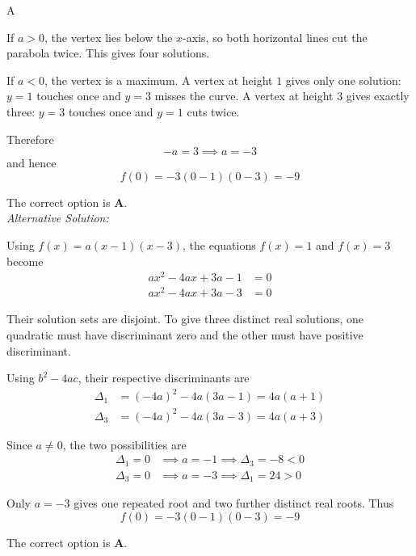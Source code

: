 \documentclass[11pt,a4paper]{article}
\begin{document}
\begin{enumerate}[label=\textbf{\arabic*.},leftmargin=*,itemsep=0pt,start=16]
\begin{djsSolution}{A}
\begin{djsSolutionFigure}
\begin{tikzpicture}[scale=1.2]
\end{tikzpicture}
\end{djsSolutionFigure}

If $a>0$, the vertex lies below the $x$-axis, so both horizontal lines cut the parabola twice. This gives four solutions.

If $a<0$, the vertex is a maximum. A vertex at height $1$ gives only one solution: $y=1$ touches once and $y=3$ misses the curve. A vertex at height $3$ gives exactly three: $y=3$ touches once and $y=1$ cuts twice.

Therefore
\[
-a=3\implies a=-3
\]
and hence
\[
f(0)=-3(0-1)(0-3)=-9
\]

The correct option is \textbf{A}.\\[5pt]

\textit{Alternative Solution:}

Using $f(x)=a(x-1)(x-3)$, the equations $f(x)=1$ and $f(x)=3$ become
\[
\begin{aligned}
ax^2-4ax+3a-1&=0\\[5pt]
ax^2-4ax+3a-3&=0
\end{aligned}
\]

Their solution sets are disjoint. To give three distinct real solutions, one quadratic must have discriminant zero and the other must have positive discriminant.

Using $b^2-4ac$, their respective discriminants are
\[
\begin{aligned}
\Delta_1&=(-4a)^2-4a(3a-1)=4a(a+1)\\[5pt]
\Delta_3&=(-4a)^2-4a(3a-3)=4a(a+3)
\end{aligned}
\]

Since $a\ne0$, the two possibilities are
\[
\begin{aligned}
\Delta_1=0&\implies a=-1\implies \Delta_3=-8<0\\[5pt]
\Delta_3=0&\implies a=-3\implies \Delta_1=24>0
\end{aligned}
\]

Only $a=-3$ gives one repeated root and two further distinct real roots. Thus
\[
f(0)=-3(0-1)(0-3)=-9
\]

The correct option is \textbf{A}.
\end{djsSolution}
\end{enumerate}
\clearpage
\thispagestyle{djssolutions}
\vspace*{8pt}
\end{document}
